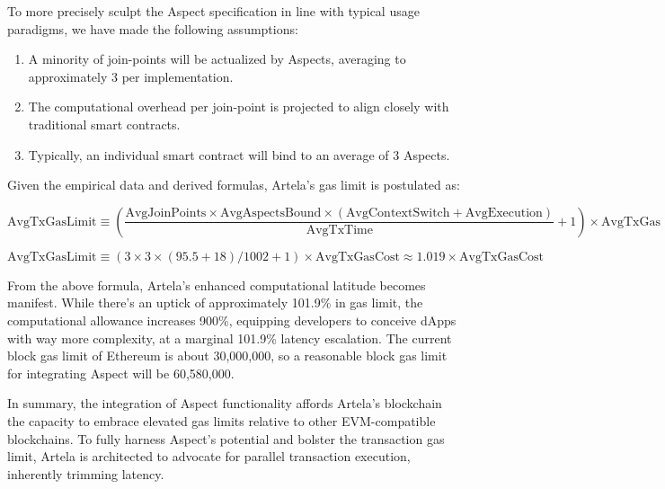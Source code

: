 To more precisely sculpt the Aspect specification in line with typical usage paradigms, we have made the following assumptions:

\begin{enumerate}
  \item A minority of join-points will be actualized by Aspects, averaging to approximately 3 per implementation.
  \item The computational overhead per join-point is projected to align closely with traditional smart contracts.
  \item Typically, an individual smart contract will bind to an average of 3 Aspects.
\end{enumerate}

Given the empirical data and derived formulas, Artela's gas limit is postulated as:

\[
  \text{AvgTxGasLimit} \equiv (\frac{\text{AvgJoinPoints} \times \text{AvgAspectsBound} \times (\text{AvgContextSwitch} + \text{AvgExecution})}{\text{AvgTxTime}} + 1) \times \text{AvgTxGas}
\]

\[
  \text{AvgTxGasLimit} \equiv (3 \times 3 \times (95.5 + 18) / 1002 + 1) \times  \text{AvgTxGasCost} \approx 1.019 \times \text{AvgTxGasCost}
\]

From the above formula, Artela's enhanced computational latitude becomes manifest. While there's an uptick of approximately 101.9\% in gas limit, the computational allowance increases 900\%, equipping developers to conceive dApps with way more complexity, at a marginal 101.9\% latency escalation. The current block gas limit of Ethereum is about 30,000,000, so a reasonable block gas limit for integrating Aspect will be 60,580,000.

In summary, the integration of Aspect functionality affords Artela's blockchain the capacity to embrace elevated gas limits relative to other EVM-compatible blockchains. To fully harness Aspect's potential and bolster the transaction gas limit, Artela is architected to advocate for parallel transaction execution, inherently trimming latency.